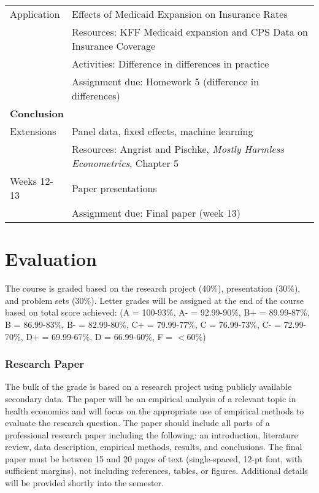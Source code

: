 \documentclass{article}
\begin{document}
\begin{longtable}{lp{13cm}}
  \hline
  Application & Effects of Medicaid Expansion on Insurance Rates \\
              & Resources: KFF Medicaid expansion and CPS Data on Insurance Coverage \\
              & Activities: Difference in differences in practice \citep{courtemanche2017} \\
              & Assignment due: Homework 5 (difference in differences) \\              
  \hline
  \multicolumn{2}{l}{\textbf{Conclusion}} \\
  \hline\hline
  Extensions & Panel data, fixed effects, machine learning \\
             & Resources:  Angrist and Pischke, \textit{Mostly Harmless Econometrics}, Chapter 5 \\
  \hline
  Weeks 12-13 & Paper presentations \\
              & Assignment due: Final paper (week 13)
\end{longtable}


\section*{Evaluation}
The course is graded based on the research project (40\%), presentation (30\%), and problem sets (30\%). Letter grades will be assigned at the end of the course based on total score achieved:
(A = 100-93\%, A- = 92.99-90\%, B+ = 89.99-87\%, B = 86.99-83\%, B- = 82.99-80\%, C+ = 79.99-77\%, C = 76.99-73\%, C- = 72.99-70\%, D+ = 69.99-67\%, D = 66.99-60\%, F = $<$60\%)


\subsubsection*{Research Paper}
The bulk of the grade is based on a research project using publicly available secondary data. The paper will be an empirical analysis of a relevant topic in health economics and will focus on the appropriate use of empirical methods to evaluate the research question. The paper should include all parts of a professional research paper including the following:  an introduction, literature review, data description, empirical methods, results, and conclusions. The final paper must be between 15 and 20 pages of text (single-spaced, 12-pt font, with sufficient margins), not including references, tables, or figures. Additional details will be provided shortly into the semester.
\end{document}
